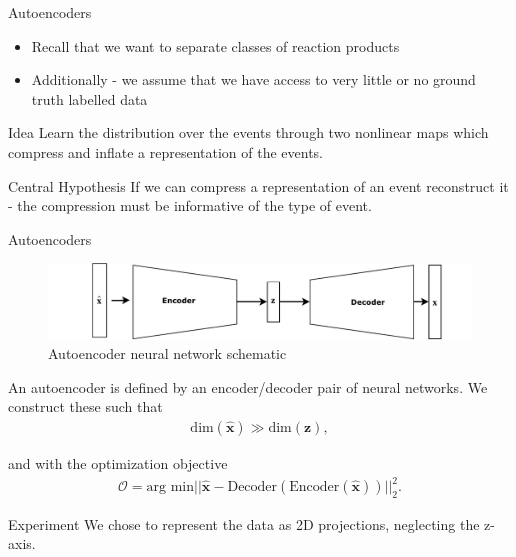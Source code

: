 \documentclass{beamer}
\begin{document}
\begin{frame}[t]{Autoencoders}
	\begin{itemize}
		\item Recall that we want to separate classes of reaction products
		\item Additionally - we assume that we have access to very little or no ground truth labelled data
	\end{itemize}
	\begin{block}{ Idea }
		Learn the distribution over the events through two nonlinear maps which compress and inflate a representation of the events.
	\end{block}
	\begin{block}{Central Hypothesis}
		If we can compress a representation of an event reconstruct it - the compression must be informative of the type of event.
	\end{block}
\end{frame}

\begin{frame}[t]{Autoencoders}
	\begin{figure}[h]
		\centering
		\includegraphics[width=0.8\linewidth]{../chapters/theory/autoencoder/plots/autoencoder.pdf}
		\caption{Autoencoder neural network schematic}%
		\label{fig:autoenc}
	\end{figure}

	An autoencoder is defined by an encoder/decoder pair of neural networks. We construct these such that 
	\begin{align}
		\text{dim}(\mathbf{\hat{x}}) \gg \text{dim}(\mathbf{z}),
	\end{align}

	and with the optimization objective
	\begin{align}
		\mathcal{O} = \text{arg min} || \mathbf{\hat{x}} - \text{Decoder}(\text{Encoder}(\mathbf{\hat{x}}))||_2 ^2.
	\end{align}
\end{frame}

\begin{frame}[t]{Experiment}
	We chose to represent the data as 2D projections, neglecting the z-axis.
\end{frame}
\end{document}
